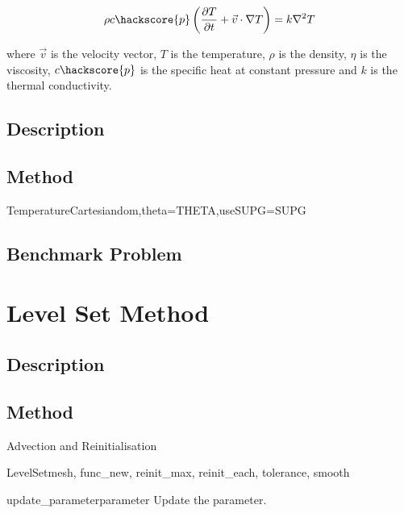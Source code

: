 \begin{equation}
\rho c\hackscore{p} \left (\frac{\partial T}{\partial t} + \vec{v} \cdot \nabla T \right ) = k \nabla^{2}T
\label{HEAT EQUATION}
\end{equation}

where $\vec{v}$ is the velocity vector, $T$ is the temperature, $\rho$ is the density, $\eta$ is the viscosity, $c\hackscore{p}$ is the specific heat at constant pressure and $k$ is the thermal conductivity.

\subsection{Description}

\subsection{Method}

\begin{classdesc}{TemperatureCartesian}{dom,theta=THETA,useSUPG=SUPG}
\end{classdesc}

\subsection{Benchmark Problem}


\section{Level Set Method}

\subsection{Description}

\subsection{Method}

Advection and Reinitialisation

\begin{classdesc}{LevelSet}{mesh, func\_new, reinit\_max, reinit\_each, tolerance, smooth}
\end{classdesc}



\begin{methoddesc}[LevelSet]{update\_parameter}{parameter}
Update the parameter.
\end{methoddesc}

